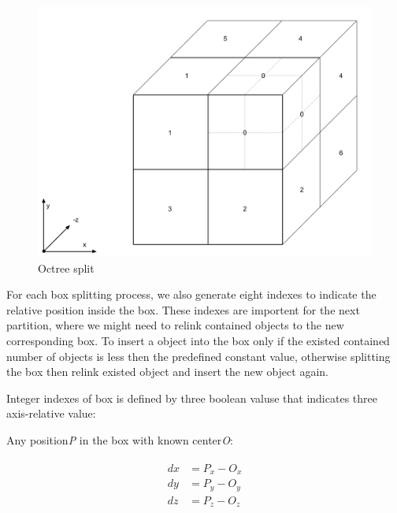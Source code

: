 \begin{figure}[H]
\caption[octree-split]{Octree split}
\label{fig:octree-split}
\centering
\includegraphics[width=\linewidth]{Figures/octree-split.png}
\decoRule
\end{figure}

For each box splitting process, we also generate eight indexes to indicate the relative position inside the box. These indexes are importent for the next partition, where we might need to relink contained objects to the new corresponding box. To insert a object into
the box only if the existed contained number of objects is less then the predefined constant value, otherwise splitting the box then relink existed object and insert the new object again.

Integer indexes of box is defined by three boolean valuse that indicates three axis-relative value:

Any position\;\emph{P} in the box with known center\emph{O}:

\[
\begin{array}{lr}
\begin{aligned}
dx &= P_x - O_x\\
dy &= P_y - O_y\\
dz &= P_z - O_z\\
\end{aligned}
\end{array}
\]

